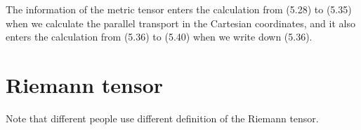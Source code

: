 \documentclass[hyperref, a4paper]{article}
\begin{document}
The information of the metric tensor enters the calculation from (5.28) to (5.35) when we calculate the 
parallel transport in the Cartesian coordinates, and it also enters the calculation from (5.36) to (5.40)
when we write down (5.36).

\section{Riemann tensor}

Note that different people use different definition of the Riemann tensor. 
\end{document}
